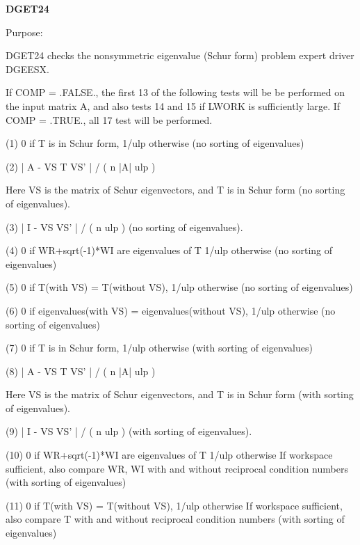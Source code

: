 {\bfseries D\+G\+E\+T24} 

\begin{DoxyParagraph}{Purpose\+: }
\begin{DoxyVerb}    DGET24 checks the nonsymmetric eigenvalue (Schur form) problem
    expert driver DGEESX.

    If COMP = .FALSE., the first 13 of the following tests will be
    be performed on the input matrix A, and also tests 14 and 15
    if LWORK is sufficiently large.
    If COMP = .TRUE., all 17 test will be performed.

    (1)     0 if T is in Schur form, 1/ulp otherwise
           (no sorting of eigenvalues)

    (2)     | A - VS T VS' | / ( n |A| ulp )

      Here VS is the matrix of Schur eigenvectors, and T is in Schur
      form  (no sorting of eigenvalues).

    (3)     | I - VS VS' | / ( n ulp ) (no sorting of eigenvalues).

    (4)     0     if WR+sqrt(-1)*WI are eigenvalues of T
            1/ulp otherwise
            (no sorting of eigenvalues)

    (5)     0     if T(with VS) = T(without VS),
            1/ulp otherwise
            (no sorting of eigenvalues)

    (6)     0     if eigenvalues(with VS) = eigenvalues(without VS),
            1/ulp otherwise
            (no sorting of eigenvalues)

    (7)     0 if T is in Schur form, 1/ulp otherwise
            (with sorting of eigenvalues)

    (8)     | A - VS T VS' | / ( n |A| ulp )

      Here VS is the matrix of Schur eigenvectors, and T is in Schur
      form  (with sorting of eigenvalues).

    (9)     | I - VS VS' | / ( n ulp ) (with sorting of eigenvalues).

    (10)    0     if WR+sqrt(-1)*WI are eigenvalues of T
            1/ulp otherwise
            If workspace sufficient, also compare WR, WI with and
            without reciprocal condition numbers
            (with sorting of eigenvalues)

    (11)    0     if T(with VS) = T(without VS),
            1/ulp otherwise
            If workspace sufficient, also compare T with and without
            reciprocal condition numbers
            (with sorting of eigenvalues)


\end{DoxyVerb}
\end{DoxyParagraph}
